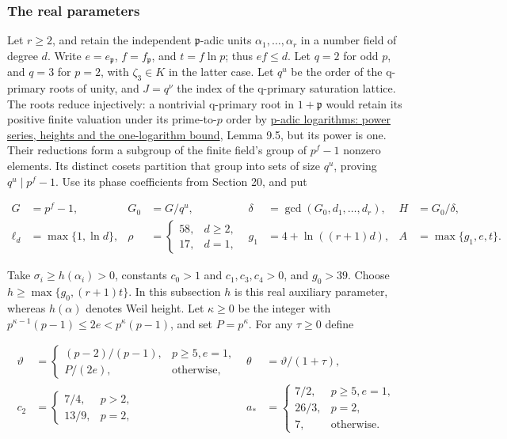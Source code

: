 \documentclass[
  11pt,
  a4paper,
]{article}
\begin{document}
\subsubsection{The real parameters}\label{the-real-parameters}

Let \(r\ge2\), and retain the independent \(\mathfrak p\)-adic units
\(\alpha_1,\ldots,\alpha_r\) in a number field of degree \(d\). Write
\(e=e_{\mathfrak p}\), \(f=f_{\mathfrak p}\), and \(t=f\ln p\); thus
\(ef\le d\). Let \(q=2\) for odd \(p\), and \(q=3\) for \(p=2\), with
\(\zeta_3\in K\) in the latter case. Let \(q^u\) be the order of the
q-primary roots of unity, and \(J=q^\nu\) the index of the q-primary
saturation lattice. The roots reduce injectively: a nontrivial q-primary
root in \(1+\mathfrak p\) would retain its positive finite valuation
under its prime-to-\(p\) order by
\href{../TR-BAKER-09.html\#4-taking-powers-until-the-exponential-applies}{p-adic
logarithms: power series, heights and the one-logarithm bound}, Lemma
9.5, but its power is one. Their reductions form a subgroup of the
finite field's group of \(p^f-1\) nonzero elements. Its distinct cosets
partition that group into sets of size \(q^u\), proving
\(q^u\mid p^f-1\). Use its phase coefficients from Section 20, and put

\[
\begin{aligned}
G&=p^f-1,&G_0&=G/q^u,&
\delta&=\gcd(G_0,d_1,\ldots,d_r),&H&=G_0/\delta,\\
\ell_d&=\max\{1,\ln d\},&
\rho&=\begin{cases}58,&d\ge2,\\17,&d=1,\end{cases}&
g_1&=4+\ln((r+1)d),&A&=\max\{g_1,e,t\}.
\end{aligned}
\tag{10.183}
\]

Take \(\sigma_i\ge h(\alpha_i)>0\), constants \(c_0>1\) and
\(c_1,c_3,c_4>0\), and \(g_0>39\). Choose \(h\ge\max\{g_0,(r+1)t\}\). In
this subsection \(h\) is this real auxiliary parameter, whereas
\(h(\alpha)\) denotes Weil height. Let \(\kappa\ge0\) be the integer
with \(p^{\kappa-1}(p-1)\le2e<p^\kappa(p-1)\), and set \(P=p^\kappa\).
For any \(\tau\ge0\) define

\[
\begin{aligned}
\vartheta&=\begin{cases}(p-2)/(p-1),&p\ge5, e=1,\\P/(2e),&\text{otherwise},\end{cases}
&\theta&=\vartheta/(1+\tau),\\
c_2&=\begin{cases}7/4,&p>2,\\13/9,&p=2,\end{cases}
&a_*&=\begin{cases}7/2,&p\ge5, e=1,\\26/3,&p=2,\\7,&\text{otherwise}.
\end{cases}
\end{aligned}
\tag{10.184}
\]
\end{document}
